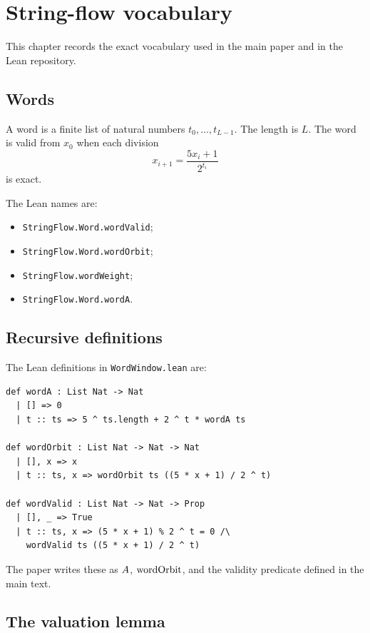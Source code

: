 \section{String-flow vocabulary}

This chapter records the exact vocabulary used in the main paper and in
the Lean repository.

\subsection{Words}

A word is a finite list of natural numbers $t_0,\dots,t_{L-1}$.  The
length is $L$.  The word is valid from $x_0$ when each division
\begin{equation*}
  x_{i+1}=\frac{5x_i+1}{2^{t_i}}
\end{equation*}
is exact.

The Lean names are:
\begin{itemize}[leftmargin=*]
\item \texttt{StringFlow.Word.wordValid};
\item \texttt{StringFlow.Word.wordOrbit};
\item \texttt{StringFlow.wordWeight};
\item \texttt{StringFlow.Word.wordA}.
\end{itemize}

\subsection{Recursive definitions}

The Lean definitions in \texttt{WordWindow.lean} are:
\begin{verbatim}
def wordA : List Nat -> Nat
  | [] => 0
  | t :: ts => 5 ^ ts.length + 2 ^ t * wordA ts

def wordOrbit : List Nat -> Nat -> Nat
  | [], x => x
  | t :: ts, x => wordOrbit ts ((5 * x + 1) / 2 ^ t)

def wordValid : List Nat -> Nat -> Prop
  | [], _ => True
  | t :: ts, x => (5 * x + 1) % 2 ^ t = 0 /\
    wordValid ts ((5 * x + 1) / 2 ^ t)
\end{verbatim}

The paper writes these as $A$, $\mathrm{wordOrbit}$, and the validity
predicate defined in the main text.

\subsection{The valuation lemma}

